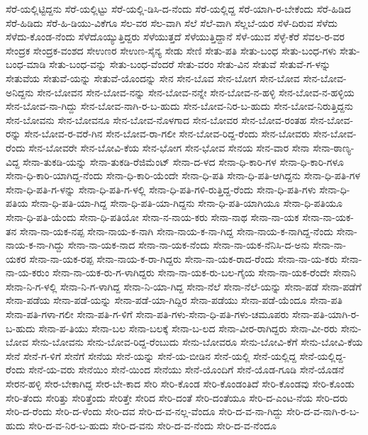 ಸೆರೆ-ಯಲ್ಲಿಟ್ಟಿದ್ದನು
ಸೆರೆ-ಯಲ್ಲಿಟ್ಟು
ಸೆರೆ-ಯಲ್ಲಿ-ಡಿಸಿ-ದ-ನೆಂದು
ಸೆರೆ-ಯಲ್ಲಿದ್ದ
ಸೆರೆ-ಯಾಗಿ-ರ-ಬೇಕೆಂದು
ಸೆರೆ-ಹಿಡಿದ
ಸೆರೆ-ಹಿಡಿದು
ಸೆರೆ-ಹಿ-ಡಿಯು-ವಿಕೆಗೂ
ಸೆಲ-ವರ
ಸೆಲ-ವಾಗಿ
ಸೆಲೆ
ಸೆಲೆ-ವಾಗಿ
ಸೆಲ್ಲಬೆ-ಯರ
ಸೆಳೆ-ದಿರುವ
ಸೆಳೆದು
ಸೆಳೆದು-ಕೊಂಡ-ನೆಂದು
ಸೆಳೆದೊಯ್ಯುತ್ತಿದ್ದರು
ಸೆಳೆಯುತ್ತದೆ
ಸೆಳೆಯುತ್ತಿದ್ದಾನೆ
ಸೆಳೆ-ಯುವ
ಸೆಳ್ಳೆ-ಕೆರೆ
ಸೆವಲ-ರ-ವರ
ಸೇಂದ್ರಕ
ಸೇಂದ್ರಕ-ವಂಶದ
ಸೇಉಣರ
ಸೇಉಣ-ಸೈನ್ಯ
ಸೇಡು
ಸೇಣಿ
ಸೇತು-ಪತಿ
ಸೇತು-ಬಂಧ
ಸೇತು-ಬಂಧ-ಗಳು
ಸೇತು-ಬಂಧ-ಮಾಡಿ
ಸೇತು-ಬಂಧ-ವನ್ನು
ಸೇತು-ಬಂಧ-ವೆಂದರೆ
ಸೇತು-ವರಂ
ಸೇತು-ವಿನ
ಸೇತುವೆ
ಸೇತುವೆ-ಗ-ಳನ್ನು
ಸೇತುವೆಯ
ಸೇತುವೆ-ಯನ್ನು
ಸೇತುವೆ-ಯೊಂದನ್ನು
ಸೇನ
ಸೇನ-ಬೊವ
ಸೇನ-ಬೋಗ
ಸೇನ-ಬೋವ
ಸೇನ-ಬೋವ-ಅನಿದ್ದನು
ಸೇನ-ಬೋವನ
ಸೇನ-ಬೋವ-ನನ್ನು
ಸೇನ-ಬೋವ-ನನ್ನೇ
ಸೇನ-ಬೋವ-ನ-ಹಳ್ಳಿ
ಸೇನ-ಬೋವ-ನ-ಹಳ್ಳಿಯ
ಸೇನ-ಬೋವ-ನಾ-ಗಿದ್ದು
ಸೇನ-ಬೋವ-ನಾಗಿ-ರ-ಬ-ಹುದು
ಸೇನ-ಬೋವ-ನಿರ-ಬ-ಹುದು
ಸೇನ-ಬೋವ-ನಿರುತ್ತಿದ್ದನು
ಸೇನ-ಬೋವನು
ಸೇನ-ಬೋವನೂ
ಸೇನ-ಬೋವ-ನೊಳಗಾದ
ಸೇನ-ಬೋವರ
ಸೇನ-ಬೋವ-ರಂತಹ
ಸೇನ-ಬೋವ-ರನ್ನು
ಸೇನ-ಬೋವ-ರ-ವರೆ-ಗಿನ
ಸೇನ-ಬೋವ-ರಾ-ಗಲೀ
ಸೇನ-ಬೋವ-ರಿದ್ದ-ರೆಂದು
ಸೇನ-ಬೋವರು
ಸೇನ-ಬೋವ-ರೆಂದು
ಸೇನ-ಬೋವರೇ
ಸೇನ-ಬೋವಿ-ಕೆಯ
ಸೇನ-ಭೋಗ
ಸೇನ-ಭೋವ
ಸೇನಯ
ಸೇನ-ವಾರ
ಸೇನಾ
ಸೇನಾ-ಠಾಣ್ಯ-ವಿದ್ದ
ಸೇನಾ-ತುಕಡಿ-ಯನ್ನು
ಸೇನಾ-ತುಕಡಿ-ರೆಜಿಮೆಂಟ್
ಸೇನಾ-ದ-ಳದ
ಸೇನಾ-ಧಿ-ಕಾರಿ-ಗಳ
ಸೇನಾ-ಧಿ-ಕಾರಿ-ಗಳೂ
ಸೇನಾ-ಧಿ-ಕಾರಿ-ಯಾಗಿದ್ದ-ನೆಂದು
ಸೇನಾ-ಧಿ-ಕಾರಿ-ಯೆಂದೇ
ಸೇನಾ-ಧಿ-ಪತಿ
ಸೇನಾ-ಧಿ-ಪತಿ-ಆಗಿದ್ದನು
ಸೇನಾ-ಧಿ-ಪತಿ-ಗಳ
ಸೇನಾ-ಧಿ-ಪತಿ-ಗ-ಳನ್ನು
ಸೇನಾ-ಧಿ-ಪತಿ-ಗ-ಳಲ್ಲಿ
ಸೇನಾ-ಧಿ-ಪತಿ-ಗಳಿ-ರುತ್ತಿದ್ದ-ರೆಂದು
ಸೇನಾ-ಧಿ-ಪತಿ-ಗಳು
ಸೇನಾ-ಧಿ-ಪತಿಯ
ಸೇನಾ-ಧಿ-ಪತಿ-ಯಾ-ಗಿದ್ದ
ಸೇನಾ-ಧಿ-ಪತಿ-ಯಾ-ಗಿದ್ದನು
ಸೇನಾ-ಧಿ-ಪತಿ-ಯಾಗಿಯೂ
ಸೇನಾ-ಧಿ-ಪತಿಯೂ
ಸೇನಾ-ಧಿ-ಪತಿ-ಯೆಂದು
ಸೇನಾ-ಧಿ-ಪತಿಯೋ
ಸೇನಾ-ನ-ನಾಯ-ಕರು
ಸೇನಾ-ನಾಥ
ಸೇನಾ-ನಾ-ಯಕ
ಸೇನಾ-ನಾ-ಯಕ-ತನ
ಸೇನಾ-ನಾ-ಯಕ-ನಪ್ಪ
ಸೇನಾ-ನಾಯ-ಕ-ನಾಗಿ
ಸೇನಾ-ನಾಯ-ಕ-ನಾ-ಗಿದ್ದ
ಸೇನಾ-ನಾಯ-ಕ-ನಾಗಿದ್ದ-ನೆಂದು
ಸೇನಾ-ನಾಯ-ಕ-ನಾ-ಗಿದ್ದು
ಸೇನಾ-ನಾ-ಯಕ-ನಾದ
ಸೇನಾ-ನಾ-ಯಕ-ನೆಂದು
ಸೇನಾ-ನಾ-ಯಕ-ನೆನಿಸಿ-ದ-ಅನು
ಸೇನಾ-ನಾ-ಯಕರ
ಸೇನಾ-ನಾ-ಯಕ-ರಪ್ಪ
ಸೇನಾ-ನಾಯ-ಕ-ರಾ-ಗಿದ್ದರು
ಸೇನಾ-ನಾ-ಯಕ-ರಾದ-ರೆಂದು
ಸೇನಾ-ನಾ-ಯ-ಕರು
ಸೇನಾ-ನಾ-ಯ-ಕರುಂ
ಸೇನಾ-ನಾ-ಯಕ-ರು-ಗ-ಳಾಗಿದ್ದರು
ಸೇನಾ-ನಾ-ಯಕ-ರು-ಬಲ-ಗೈಯ
ಸೇನಾ-ನಾ-ಯಕ-ರೆಂದೇ
ಸೇನಾನಿ
ಸೇನಾ-ನಿ-ಗ-ಳಲ್ಲಿ
ಸೇನಾ-ನಿ-ಗ-ಳಾಗಿದ್ದ
ಸೇನಾ-ನಿ-ಯಾ-ಗಿದ್ದ
ಸೇನಾ-ನೆಲೆ
ಸೇನಾ-ನೆಲೆ-ಯನ್ನು
ಸೇನಾ-ಪಡೆ
ಸೇನಾ-ಪಡೆಗೆ
ಸೇನಾ-ಪಡೆಯ
ಸೇನಾ-ಪಡೆ-ಯನ್ನು
ಸೇನಾ-ಪಡೆ-ಯಾ-ಗಿದ್ದಿರ
ಸೇನಾ-ಪಡೆಯು
ಸೇನಾ-ಪಡೆ-ಯೆಂದೂ
ಸೇನಾ-ಪತಿ
ಸೇನಾ-ಪತಿ-ಗಳಾ-ಗಲೀ
ಸೇನಾ-ಪತಿ-ಗ-ಳಿಗೆ
ಸೇನಾ-ಪತಿ-ಗಳು-ಸೇನಾ-ಧಿ-ಪತಿ-ಗಳು-ಚಮೂಪರು
ಸೇನಾ-ಪತಿ-ಯಾಗಿ-ರ-ಬ-ಹುದು
ಸೇನಾ-ಪ-ತಿಯು
ಸೇನಾ-ಬಲ
ಸೇನಾ-ಬಲಕ್ಕೆ
ಸೇನಾ-ಬ-ಲದ
ಸೇನಾ-ವೀರ-ರಾಗಿದ್ದರು
ಸೇನಾ-ವೀ-ರರು
ಸೇನು-ಬೋವ
ಸೇನು-ಬೋವನು
ಸೇನು-ಬೋವ-ರಿದ್ದ-ರೆಂಬುದು
ಸೇನು-ಬೋವರೂ
ಸೇನು-ಬೋವಿ-ಕೆಗೆ
ಸೇನು-ಬೋವಿ-ಕೆಯ
ಸೇನೆ
ಸೇನೆ-ಗ-ಳಿಗೆ
ಸೇನೆಗೆ
ಸೇನೆಯ
ಸೇನೆ-ಯನ್ನು
ಸೇನೆ-ಯ-ಬೀಡಿನ
ಸೇನೆ-ಯಲ್ಲಿ
ಸೇನೆ-ಯಲ್ಲಿದ್ದ
ಸೇನೆ-ಯಲ್ಲಿದ್ದ-ರೆಂದು
ಸೇನೆ-ಯ-ವರು
ಸೇನೆಯಿಂ
ಸೇನೆ-ಯಿಂದ
ಸೇನೆಯು
ಸೇನೆ-ಯೊಂದಿಗೆ
ಸೇನೆ-ಯೊಡ-ಗೂಡಿ
ಸೇನೆ-ಯೊಡನೆ
ಸೇರನ-ಹಳ್ಳಿ
ಸೇರ-ಬೇಕಾಗಿದ್ದ
ಸೇರ-ಬೇ-ಕಾದ
ಸೇರಿ
ಸೇರಿ-ಕೊಂಡ
ಸೇರಿ-ಕೊಂಡಂತಿದೆ
ಸೇರಿ-ಕೊಂಡವು
ಸೇರಿ-ಕೊಂಡು
ಸೇರಿ-ತೆಂದು
ಸೇರಿತ್ತು
ಸೇರಿತ್ತೆಂದು
ಸೇರಿತ್ತೇ
ಸೇರಿದ
ಸೇರಿ-ದಂತೆ
ಸೇರಿ-ದಂತೆಯೂ
ಸೇರಿ-ದ-ಎಂಟ-ನೆಯ
ಸೇರಿ-ದರು
ಸೇರಿ-ದ-ರೆಂದು
ಸೇರಿ-ದ-ಳೆಂದು
ಸೇರಿ-ದವ
ಸೇರಿ-ದ-ವ-ನಲ್ಲ-ವೆಂದೂ
ಸೇರಿ-ದ-ವ-ನಾ-ಗಿದ್ದು
ಸೇರಿ-ದ-ವ-ನಾಗಿ-ರ-ಬ-ಹುದು
ಸೇರಿ-ದ-ವ-ನಿರ-ಬ-ಹುದು
ಸೇರಿ-ದ-ವನು
ಸೇರಿ-ದ-ವ-ನೆಂದು
ಸೇರಿ-ದ-ವ-ನೆಂದೂ

